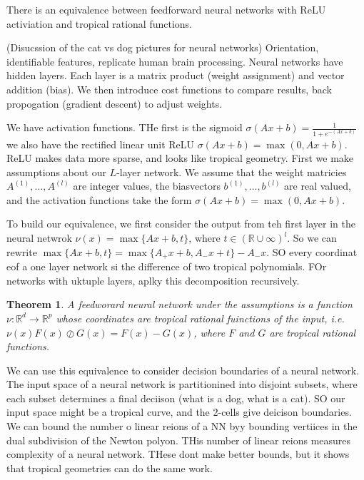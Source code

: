 \documentclass[12pt]{memoir}
\newtheorem{prototheorem}{Theorem}[section]
\newenvironment{theorem}
   {\begin{prototheorem}}
   {\end{prototheorem}}
\theoremstyle{definition}
\def\RR{{\mathbb R}}
\begin{document}


There is an equivalence between feedforward neural networks with ReLU activiation and tropical rational functions.

(Disucssion of the cat vs dog pictures for neural networks) Orientation, identifiable features, replicate human brain processing. Neural networks have hidden layers. Each layer is a matrix product (weight assignment) and vector addition (bias). We then introduce cost functions to compare results, back propogation (gradient descent) to adjust weights.

We have activation functions. THe first is the sigmoid $\sigma(Ax+b)= \frac{1}{1+e^{-(Ax+b)}}$ we also have the rectified linear unit ReLU $\sigma(Ax+b)= \max(0,Ax+b)$. ReLU makes data more sparse, and looks like tropical geometry. First we make assumptions about our $L$-layer network. We assume that the weight matricies $A^(1), \dots, A^{(l)}$ are integer values, the biasvectors $b^{(1)}, \dots, b^{(l)}$ are real valued, and the activation functions take the form  $\sigma(Ax+b)= \max(0,Ax+b)$.


To build our equivalence, we first consider the output from teh first layer in the neural netwrok $\nu(x) = \max\{Ax+b,t\}$, where $t \in (\RR\cup \infty)^l$. So we can rewrite $\max\{Ax+b,t\} = \max\{A_+x+b, A_-x + t\} - A_-x$. SO every coordinat eof a one layer network si the difference of two tropical polynomials. FOr networks with uktuple layers, aplky this decomposition recursively.

\begin{theorem}
    A feedworard neural network under the assumptions is a function $\nu: \RR^d \rightarrow \RR^p$ whose coordinates are tropical rational fuinctions of the input, i.e. $\nu(x) F(x) \oslash G(x) = F(x) -G(x)$, where $F$ and $G$ are tropical rational functions.
\end{theorem}


We can use this equivalence to consider decision boundaries of a neural network. The input space of a neural network is partitionined into disjoint subsets, where each subset determines a final deciison (what is a dog, what is a cat). SO our input space might be a tropical curve, and the 2-cells give deicison boundaries. We can bound the number o linear reions of a NN byy bounding vertiices in the dual subdivision of the Newton polyon. THis number of linear reions measures complexity of a neural network. THese dont make better bounds, but it shows that tropical geometries can do the same work.
\end{document}

